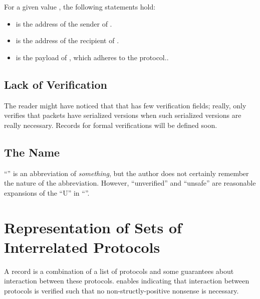 \documentclass{report}
\begin{document}
For a given   value , the following statements hold:
\begin{itemize}
  \item {}  is the address of the sender of .
  \item {}  is the address of the recipient of .
  \item {}  is the payload of , which adheres to the   protocol..
\end{itemize}

\section{Lack of Verification}
The reader might have noticed that that  has few verification fields; really,  only verifies that packets have serialized versions when such serialized versions are really necessary.  Records for formal verifications will be defined soon.

\section{The Name}
``'' is an abbreviation of \emph{something}, but the author does not certainly remember the nature of the abbreviation.  However, ``unverified'' and ``unsafe'' are reasonable expansions of the ``U'' in ``''.

\chapter{Representation of Sets of Interrelated Protocols}
A  record is a combination of a list of protocols and some guarantees about interaction between these protocols.   enables indicating that interaction between protocols is verified such that no non-structly-positive nonsense is necessary.
\end{document}

